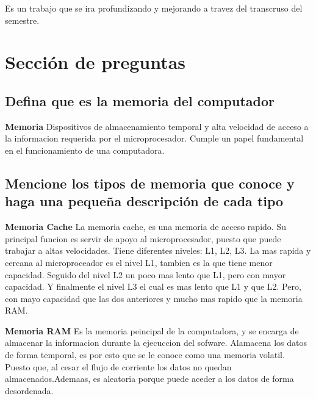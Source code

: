 \documentclass{article}
\begin{document}
Es un trabajo que se ira profundizando y mejorando a travez del transcruso del semestre.

\section{Sección de preguntas}\label{contenido}

\subsection{Defina que es la memoria del computador}


\begin{tcolorbox}[colupper=red!75!black]
	\textbf{Memoria}
	\tcblower
	Dispositivos de almacenamiento temporal y alta velocidad de acceso a la informacion requerida por el microprocesador. Cumple un papel fundamental en el funcionamiento de una computadora.
\end{tcolorbox}

\subsection{Mencione los tipos de memoria que conoce y haga una pequeña descripción de cada tipo}

\begin{tcolorbox}[colupper=red!75!black]
	\textbf{Memoria Cache}
	\tcblower
	La memoria cache, es una memoria de acceso rapido. Su principal funcion es servir de apoyo al microprocesador, puesto que puede trabajar a altas velocidades. Tiene diferentes niveles: L1, L2, L3. La mas rapida y cercana al microproceador es el nivel L1, tambien es la que tiene menor capacidad. Seguido del nivel L2 un poco mas lento que L1, pero con mayor capacidad. Y finalmente el nivel L3 el cual es mas lento que L1 y que L2. Pero, con mayo capacidad que las dos anteriores y mucho mas rapido que la memoria RAM.
\end{tcolorbox}

\begin{tcolorbox}[colupper=red!75!black]
	\textbf{Memoria RAM}
	\tcblower
	Es la memoria peincipal de la computadora, y se encarga de almacenar la informacion durante la ejecuccion del sofware. Alamacena los datos de forma temporal, es por esto que se le conoce como una memoria volatil. Puesto que, al cesar el flujo de corriente los datos no quedan almacenados.Ademaas, es aleatoria porque puede aceder a los datos de forma desordenada.
\end{tcolorbox}
\end{document}
